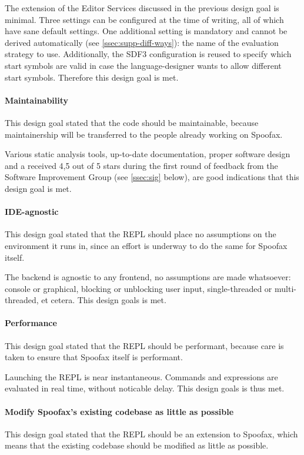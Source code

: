 The extension of the Editor Services discussed in the previous design goal is
minimal. Three settings can be configured at the time of writing, all of which
have sane default settings. One additional setting is mandatory and cannot be
derived automatically (see \cref{ssec:supp-diff-ways}): the name of the
evaluation strategy to use. Additionally, the SDF3 configuration is reused to
specify which start symbols are valid in case the language-designer wants to
allow different start symbols. Therefore this design goal is met.

\paragraph{Maintainability} This design goal stated that the code should be
maintainable, because maintainership will be transferred to the people already
working on Spoofax.

Various static analysis tools, up-to-date documentation, proper software design
and a received 4,5 out of 5 stars during the first round of feedback from the
Software Improvement Group (see \cref{ssec:sig} below), are good indications that
this design goal is met.

\paragraph{IDE-agnostic} This design goal stated that the REPL should place no
assumptions on the environment it runs in, since an effort is underway to do the
same for Spoofax itself.

The backend is agnostic to any frontend, no assumptions are made whatsoever:
console or graphical, blocking or unblocking user input, single-threaded or
multi-threaded, et cetera. This design goals is met.

\paragraph{Performance} This design goal stated that the REPL should be
performant, because care is taken to ensure that Spoofax itself is performant.

Launching the REPL is near instantaneous. Commands and expressions are evaluated
in real time, without noticable delay. This design goals is thus met.

\paragraph{Modify Spoofax's existing codebase as little as possible} This design
goal stated that the REPL should be an extension to Spoofax, which means that
the existing codebase should be modified as little as possible.

